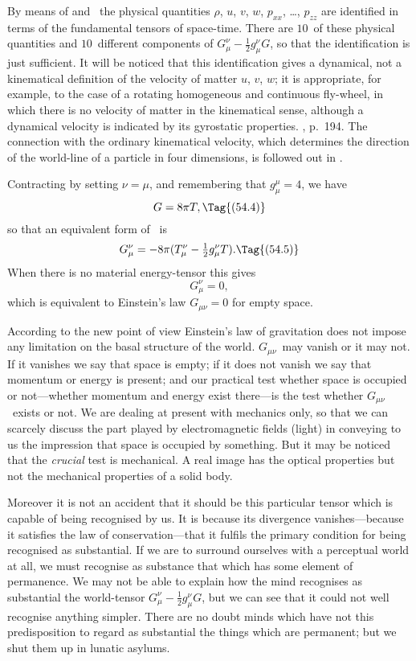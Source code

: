 \documentclass[12pt]{book}
\begin{document}
By means of  and~ the physical quantities $\rho$, $u$, $v$, $w$, $p_{xx}$, \dots, $p_{zz}$
are identified in terms of the fundamental tensors of space-time. There are $10$~of
these physical quantities and $10$~different components of $G_{\mu}^{\nu} - \frac{1}{2}g_{\mu}^{\nu} G$, so that
the identification is just sufficient. It will be noticed that this identification
gives a dynamical, not a kinematical definition of the velocity of matter
$u$, $v$, $w$; it is appropriate, for example, to the case of a rotating homogeneous
and continuous fly-wheel, in which there is no velocity of matter in the kinematical
sense, although a dynamical velocity is indicated by its gyrostatic
%
properties\footnotemark.\footnotetext
  {, p.~194.}
The connection with the ordinary kinematical velocity, which
%
determines the direction of the world-line of a particle in four dimensions, is
followed out in .

Contracting  by setting $\nu = \mu$, and remembering that $g_{\mu}^{\mu} = 4$, we have
\[
G = 8\pi T,
\Tag{(54.4)}
\]
so that an equivalent form of~ is
\[
G_{\mu}^{\nu} = -8\pi(T_{\mu}^{\nu} - \tfrac{1}{2} g_{\mu}^{\nu}T).
\Tag{(54.5)}
\]
When there is no material energy-tensor this gives
\[
G_{\mu}^{\nu} = 0,
\]
which is equivalent to Einstein's law $G_{\mu\nu} = 0$ for empty space.

According to the new point of view Einstein's law of gravitation does not
impose any limitation on the basal structure of the world. $G_{\mu\nu}$~may vanish or
it may not. If it vanishes we say that space is empty; if it does not vanish
we say that momentum or energy is present; and our practical test whether
space is occupied or not---whether momentum and energy exist there---is the
test whether $G_{\mu\nu}$~exists or not\footnotemark.\footnotetext
  {We are dealing at present with mechanics only, so that we can scarcely discuss the part
  played by electromagnetic fields (light) in conveying to us the impression that space is occupied
  by something. But it may be noticed that the \emph{crucial} test is mechanical. A real image has the
  optical properties but not the mechanical properties of a solid body.}

Moreover it is not an accident that it should be this particular tensor
which is capable of being recognised by us. It is because its divergence
vanishes---because it satisfies the law of conservation---that it fulfils the
primary condition for being recognised as substantial. If we are to surround
ourselves with a perceptual world at all, we must recognise as substance that
which has some element of permanence. We may not be able to explain how
the mind recognises as substantial the world-tensor $G_{\mu}^{\nu} - \frac{1}{2}g_{\mu}^{\nu} G$, but we can
see that it could not well recognise anything simpler. There are no doubt
minds which have not this predisposition to regard as substantial the things
which are permanent; but we shut them up in lunatic asylums.
\end{document}

